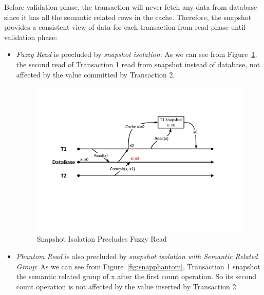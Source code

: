 \noindent Before validation phase, the transaction will never fetch any data from database since it has all the semantic related rows in the cache. Therefore, the snapshot provides a consistent view of data for each transaction from read phase until validation phase: 
\begin{itemize}[noitemsep]
	\item \textit{Fuzzy Read} is precluded by \textit{snapshot isolation}: As we can see from Figure~\ref{fig:snapfuzzy}, the second read of Transaction 1 read from snapshot instead of database, not affected by the value committed by Transaction 2.
	
	\begin{figure}[h]
		\centering
		\includegraphics[width=\linewidth]{figs/snapfuzzy.pdf}
		\caption{Snapshot Isolation Precludes Fuzzy Read}
		\label{fig:snapfuzzy}
	\end{figure}
	
	\item \textit{Phantom Read} is also precluded by \textit{snapshot isolation with Semantic Related Group}: As we can see from Figure~\ref{fig:snapphantom}, Transaction 1 snapshot the semantic related group of x after the first count operation. So its second count operation is not affected by the value inserted by Transaction 2.
	

\end{itemize}
